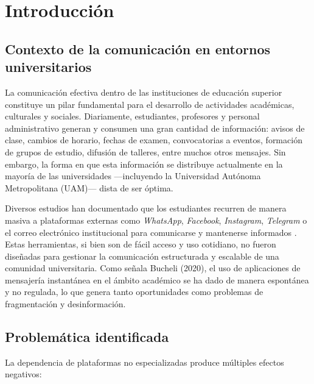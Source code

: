 \section{Introducción}

\subsection{Contexto de la comunicación en entornos universitarios}

La comunicación efectiva dentro de las instituciones de educación superior constituye un pilar fundamental para el desarrollo de actividades académicas, culturales y sociales. Diariamente, estudiantes, profesores y personal administrativo generan y consumen una gran cantidad de información: avisos de clase, cambios de horario, fechas de examen, convocatorias a eventos, formación de grupos de estudio, difusión de talleres, entre muchos otros mensajes. Sin embargo, la forma en que esta información se distribuye actualmente en la mayoría de las universidades —incluyendo la Universidad Autónoma Metropolitana (UAM)— dista de ser óptima.

Diversos estudios han documentado que los estudiantes recurren de manera masiva a plataformas externas como \textit{WhatsApp}, \textit{Facebook}, \textit{Instagram}, \textit{Telegram} o el correo electrónico institucional para comunicarse y mantenerse informados \cite{bucheli2020whatsapp}. Estas herramientas, si bien son de fácil acceso y uso cotidiano, no fueron diseñadas para gestionar la comunicación estructurada y escalable de una comunidad universitaria. Como señala Bucheli (2020), el uso de aplicaciones de mensajería instantánea en el ámbito académico se ha dado de manera espontánea y no regulada, lo que genera tanto oportunidades como problemas de fragmentación y desinformación.

\subsection{Problemática identificada}

La dependencia de plataformas no especializadas produce múltiples efectos negativos:

